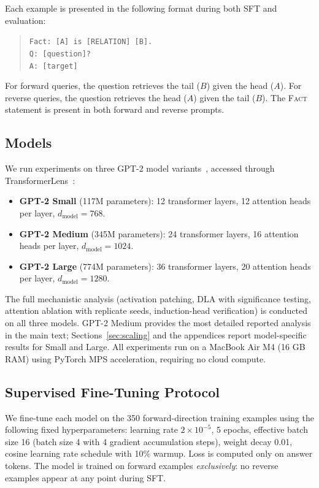 \documentclass[11pt]{article}
\begin{document}
Each example is presented in the following format during both SFT and evaluation:

\begin{quote}
\texttt{Fact: [A] is [RELATION] [B].}\\
\texttt{Q: [question]?}\\
\texttt{A: [target]}
\end{quote}

For forward queries, the question retrieves the tail ($B$) given the head ($A$).
For reverse queries, the question retrieves the head ($A$) given the tail ($B$).
The \textsc{Fact} statement is present in both forward and reverse prompts.

\subsection{Models}

We run experiments on three GPT-2 model
variants~\cite{radford2019language}, accessed through
TransformerLens~\cite{nanda2022transformerlens}:

\begin{itemize}
  \item \textbf{GPT-2 Small} (117M parameters): 12 transformer layers, 12
  attention heads per layer, $d_{\text{model}} = 768$.
  \item \textbf{GPT-2 Medium} (345M parameters): 24 transformer layers, 16
  attention heads per layer, $d_{\text{model}} = 1024$.
  \item \textbf{GPT-2 Large} (774M parameters): 36 transformer layers, 20
  attention heads per layer, $d_{\text{model}} = 1280$.
\end{itemize}

The full mechanistic analysis (activation patching, DLA with significance
testing, attention ablation with replicate seeds, induction-head verification)
is conducted on all three models. GPT-2 Medium provides the most detailed
reported analysis in the main text; Sections~\ref{sec:scaling} and the
appendices report model-specific results for Small and Large. All experiments
run on a MacBook Air M4 (16 GB RAM) using PyTorch MPS acceleration, requiring
no cloud compute.

\subsection{Supervised Fine-Tuning Protocol}

We fine-tune each model on the 350 forward-direction training examples using
the following fixed hyperparameters: learning rate $2 \times 10^{-5}$, 5
epochs, effective batch size 16 (batch size 4 with 4 gradient accumulation
steps), weight decay 0.01, cosine learning rate schedule with 10\% warmup.
Loss is computed only on answer tokens. The model is trained on forward
examples \emph{exclusively}: no reverse examples appear at any point during SFT.
\end{document}
